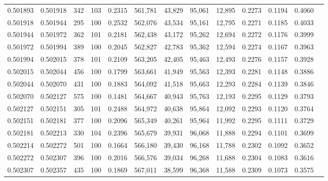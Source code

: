 \begin{tabular}{rrrrrrrrrrrrr}
0.501893 & 0.501918 &   342 & 103 &                                     0.2315 & 561,781 &  43,829 &  95,061 &  12,895 & 0.2273 & 0.1194 & 0.4060 \\
0.501918 & 0.501944 &   295 & 100 &                                     0.2532 & 562,076 &  43,534 &  95,161 &  12,795 & 0.2271 & 0.1185 & 0.4033 \\
0.501944 & 0.501972 &   362 & 101 &                                     0.2181 & 562,438 &  43,172 &  95,262 &  12,694 & 0.2272 & 0.1176 & 0.3999 \\
0.501972 & 0.501994 &   389 & 100 &                                     0.2045 & 562,827 &  42,783 &  95,362 &  12,594 & 0.2274 & 0.1167 & 0.3963 \\
0.501994 & 0.502015 &   378 & 101 &                                     0.2109 & 563,205 &  42,405 &  95,463 &  12,493 & 0.2276 & 0.1157 & 0.3928 \\
0.502015 & 0.502044 &   456 & 100 &                                     0.1799 & 563,661 &  41,949 &  95,563 &  12,393 & 0.2281 & 0.1148 & 0.3886 \\
0.502044 & 0.502070 &   431 & 100 &                                     0.1883 & 564,092 &  41,518 &  95,663 &  12,293 & 0.2284 & 0.1139 & 0.3846 \\
0.502070 & 0.502127 &   575 & 100 &                                     0.1481 & 564,667 &  40,943 &  95,763 &  12,193 & 0.2295 & 0.1129 & 0.3793 \\
0.502127 & 0.502151 &   305 & 101 &                                     0.2488 & 564,972 &  40,638 &  95,864 &  12,092 & 0.2293 & 0.1120 & 0.3764 \\
0.502151 & 0.502181 &   377 & 100 &                                     0.2096 & 565,349 &  40,261 &  95,964 &  11,992 & 0.2295 & 0.1111 & 0.3729 \\
0.502181 & 0.502213 &   330 & 104 &                                     0.2396 & 565,679 &  39,931 &  96,068 &  11,888 & 0.2294 & 0.1101 & 0.3699 \\
0.502214 & 0.502272 &   501 & 100 &                                     0.1664 & 566,180 &  39,430 &  96,168 &  11,788 & 0.2302 & 0.1092 & 0.3652 \\
0.502272 & 0.502307 &   396 & 100 &                                     0.2016 & 566,576 &  39,034 &  96,268 &  11,688 & 0.2304 & 0.1083 & 0.3616 \\
0.502307 & 0.502357 &   435 & 100 &                                     0.1869 & 567,011 &  38,599 &  96,368 &  11,588 & 0.2309 & 0.1073 & 0.3575 \\

\end{tabular}
